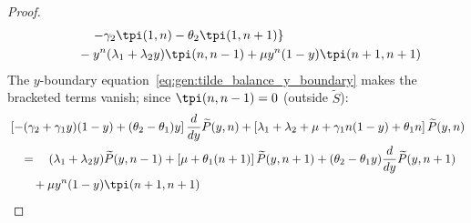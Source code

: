 \begin{proof}
\begin{align*}
\begin{split}
            & \quad \quad \quad \left. - \gamma_2 \tpi(1,n) - \theta_2 \tpi(1,n+1) \right\} \\
            & \quad \quad - y^n (\lambda_1 + \lambda_2 y) \tpi(n,n-1) + \mu y^n (1-y) \tpi(n+1,n+1)
        \end{split}
    \end{align*}
    The $y$-boundary equation~\eqref{eq:gen:tilde_balance_y_boundary} makes the bracketed terms vanish; since $\tpi(n,n-1)=0$ (outside $\widetilde{S}$):
    \begin{align}
        \begin{split}
            & \left[ -(\gamma_2 + \gamma_1 y)(1-y) + (\theta_2 - \theta_1) y \right] \frac{d}{dy} \widetilde{P}(y,n) + \left[ \lambda_1 + \lambda_2 + \mu + \gamma_1 n(1-y) + \theta_1 n \right] \widetilde{P}(y,n) \\
            & \quad = \quad (\lambda_1 + \lambda_2 y) \widetilde{P}(y,n-1) + \left[ \mu + \theta_1 (n+1) \right] \widetilde{P}(y,n+1) + (\theta_2 - \theta_1 y) \frac{d}{dy} \widetilde{P}(y,n+1) \\
            & \quad \quad + \mu y^n (1-y) \tpi(n+1,n+1)
        \end{split}
    \end{align}
\end{proof}


